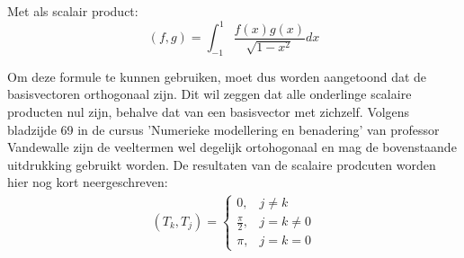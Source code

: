 \documentclass[a4paper, 12pt, titlepage, fleqn]{article}
\begin{document}
Met als scalair product:
\begin{equation*}
(f,g) = \int_{-1}^1\frac{f(x)g(x)}{\sqrt{1-x^2}}dx
\end{equation*}

Om deze formule te kunnen gebruiken, moet dus worden aangetoond dat de basisvectoren orthogonaal zijn. Dit wil zeggen dat alle onderlinge scalaire producten nul zijn, behalve dat van een basisvector met zichzelf. Volgens bladzijde 69 in de cursus 'Numerieke modellering en benadering' van professor Vandewalle zijn de veeltermen wel degelijk ortohogonaal en mag de bovenstaande uitdrukking gebruikt worden. De resultaten van de scalaire prodcuten worden hier nog kort neergeschreven:
\begin{align}\label{eq:scalairProduct}
(T_k,T_j) = 
\begin{cases}
0,	& j \neq k\\
\frac{\pi}{2}, & j = k \neq 0\\
\pi, & j = k = 0
\end{cases}
\end{align}
\end{document}
